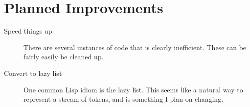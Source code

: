 \documentclass{article}[1994/05/24]
\begin{document}
\section{Planned Improvements}

\begin{description}

\item[Speed things up] There are several instances of code that is
clearly inefficient. These can be fairly easily be cleaned up.

\item[Convert to lazy list] One common Lisp idiom is the lazy
list.  This seems like a natural way to represent a stream of
tokens, and is something I plan on changing.

\end{description}


\end{document}
